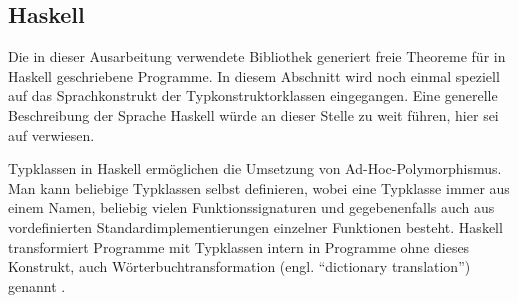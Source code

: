 \subsection{Haskell}

Die in dieser Ausarbeitung verwendete Bibliothek generiert freie Theoreme für in Haskell geschriebene Programme. In diesem Abschnitt wird noch einmal speziell auf das Sprachkonstrukt der Typkonstruktorklassen eingegangen.
Eine generelle Beschreibung der Sprache Haskell würde an dieser Stelle zu weit führen, hier sei auf \cite{haskell} verwiesen.







Typklassen in Haskell ermöglichen die Umsetzung von Ad-Hoc-Polymorphismus. Man kann beliebige Typklassen selbst definieren,
wobei eine Typklasse immer aus einem Namen, beliebig vielen Funktionssignaturen und gegebenenfalls auch aus vordefinierten
Standardimplementierungen einzelner Funktionen besteht. Haskell transformiert Programme mit Typklassen intern in Programme
ohne dieses Konstrukt, auch Wörterbuchtransformation (engl. ``dictionary translation'') genannt \cite{jones}.


